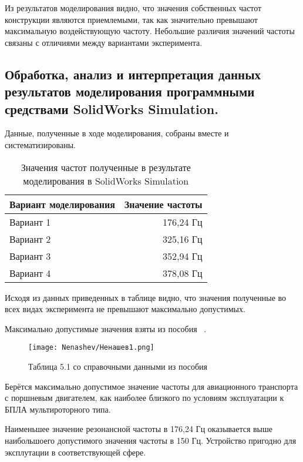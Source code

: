 
Из результатов моделирования видно, что значения собственных частот
конструкции являются приемлемыми, так как значительно превышают
максимальную воздействующую частоту. Небольшие различия значений
частоты связаны с отличиями между вариантами эксперимента.

\subsection{Обработка, анализ и интерпретация данных результатов
моделирования программными средствами SolidWorks Simulation.}

Данные, полученные в ходе моделирования, собраны вместе и
систематизированы.

\begin{table}[H]
  \centering
  \begin{tabular}{|l | r |}
    \hline
    Вариант моделирования & Значение частоты \\ \hline
    Вариант 1 & 176,24 Гц\\ \hline
    Вариант 2 & 325,16 Гц\\ \hline
    Вариант 3 & 352,94 Гц \\ \hline
    Вариант 4 & 378,08 Гц \\ \hline
  \end{tabular}
  \caption{Значения частот полученные в результате моделирования в SolidWorks Simulation}
\end{table}

Исходя из данных приведенных в таблице видно, что значения полученные
во всех видах эксперимента не превышают максимально допустимых.

Максимально допустимые значения взяты из пособия ~\cite{Nenashev}.

\begin{figure}[H]
  \centering
  \texttt{[image: Nenashev/Ненашев1.png]}
  \caption{Таблица 5.1 со справочными данными из пособия}
\end{figure}

Берётся максимально допустимое значение частоты для авиационного транспорта с
поршневым двигателем, как наиболее близкого по условиям эксплуатации к
БПЛА мультироторного типа.

Наименьшее значение резонансной частоты в 176,24 Гц оказывается выше
наибольшоего допустимого значения частоты в 150 Гц. Устройство пригодно для
эксплутации в соответствующей сфере.

\newpage

